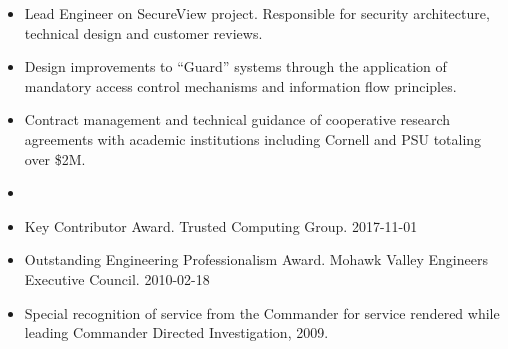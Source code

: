 \documentclass[letterpaper,11pt]{article}
\begin{document}
\begin {itemize}
  \setlength {\itemsep}{1pt}
  \setlength {\parskip}{0pt}
  \setlength {\parsep}{0pt}
  \item Lead Engineer on SecureView project. Responsible for security
    architecture, technical design and customer reviews.
  \item Design improvements to ``Guard'' systems through the application
    of mandatory access control mechanisms and information flow principles.
  \item Contract management and technical guidance of cooperative research
    agreements with academic institutions including Cornell and PSU
    totaling over \$2M.
\end {itemize}

\begin{itemize}
  \item[]
\end{itemize}

\begin {itemize}
  \setlength {\itemsep}{1pt}
  \setlength {\parskip}{0pt}
  \setlength {\parsep}{0pt}
  \item Key Contributor Award.
    Trusted Computing Group.
    2017-11-01
  \item Outstanding Engineering Professionalism Award.
    Mohawk Valley Engineers Executive Council.
    2010-02-18
  \item Special recognition of service from the Commander for service
    rendered while leading Commander Directed Investigation, 2009.
\end {itemize}
\end{document}
